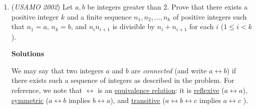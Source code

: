 \begin{enumerate}
 



\textbf{Solution 2}

As in the first solution, we obtain the result that $f$ satisfies the condition

 $f(a) + f(b) = f(a+b)$.

 

 We note that

 $f(x) = f\left[ \left(\frac{x+1}{2}\right)^2 - \left( \frac{x-1}{2} \right)^2 \right] = \frac{x+1}{2} f \left( \frac{x+1}{2} \right) - \frac{x-1}{2} f \left( \frac{x-1}{2} \right)$.

 

 Since $f(2t) = 2f(t)$, this is equal to

 $\frac{(x+1)[f(x) +f(1)]}{4} - \frac{(x-1)[f(x) - f(1)]}{4} = \frac{xf(1) + f(x)}{2}$

 

 It follows that $f$ must be of the form $f(x) = kx$.

 


 <i>Alternate solutions are always welcome. If you have a different, elegant solution to this problem, please \href{https://artofproblemsolving.com/wiki/index.php?title=2002\_USAMO\_Problems/Problem\_4&action=edit}{add it} to this page.</i>



	\item (\textit{USAMO 2002}) Let $a, b$ be integers greater than 2.  Prove that there exists a positive integer $k$ and a finite sequence $n_1, n_2, \ldots, n_k$ of positive integers such that $n_1 = a$, $n_k = b$, and $n_in_{i+1}$ is divisible by $n_i + n_{i+1}$ for each $i$ ($1 \le i < k$).


 



\textbf{Solutions}

We may say that two integers $a$ and $b$ are \textit{connected} (and write $a \leftrightarrow b$) if there exists such a sequence of integers as described in the problem.  For reference, we note that $\leftrightarrow$ is an \href{https://artofproblemsolving.com/wiki/index.php?title=Equivalence\_relation}{equivalence relation}: it is \href{https://artofproblemsolving.com/wiki/index.php?title=Reflexive}{reflexive} ($a \leftrightarrow a$), \href{https://artofproblemsolving.com/wiki/index.php?title=Symmetric}{symmetric} ($a \leftrightarrow b$ implies $b \leftrightarrow a$), and \href{https://artofproblemsolving.com/wiki/index.php?title=Transitive}{transitive} ($a \leftrightarrow b \leftrightarrow c$ implies $a \leftrightarrow c$ ).


\end{enumerate}

